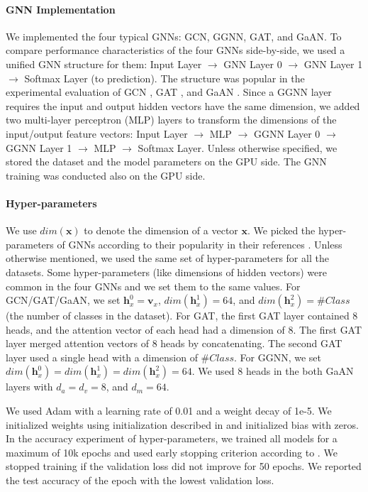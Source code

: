 \paragraph{GNN Implementation}
We implemented the four typical GNNs: GCN, GGNN, GAT, and GaAN.
To compare performance characteristics of the four GNNs side-by-side, we used a unified GNN structure for them: Input Layer $\rightarrow$ GNN Layer 0 $\rightarrow$ GNN Layer 1 $\rightarrow$ Softmax Layer (to prediction).
The structure was popular in the experimental evaluation of GCN \cite{kipf2017_gcn}, GAT \cite{huang2018_gat}, and GaAN \cite{zhang2018_gaan}.
Since a GGNN layer requires the input and output hidden vectors have the same dimension, we added two multi-layer perceptron (MLP) layers to transform the dimensions of the input/output feature vectors: Input Layer $\rightarrow$ MLP $\rightarrow$ GGNN Layer 0 $\rightarrow$ GGNN Layer 1 $\rightarrow$ MLP $\rightarrow$ Softmax Layer.
Unless otherwise specified, we stored the dataset and the model parameters on the GPU side.
The GNN training was conducted also on the GPU side.

\paragraph{Hyper-parameters}
\label{sec:hyper-parameters}

We use $dim(\boldsymbol{x})$ to denote the dimension of a vector $\boldsymbol{x}$.
%
We picked the hyper-parameters of GNNs according to their popularity in their references \cite{kipf2017_gcn, li2015_ggnn, huang2018_gat, zhang2018_gaan}.
%
Unless otherwise mentioned, we used the same set of hyper-parameters for all the datasets. 
%
Some hyper-parameters (like dimensions of hidden vectors) were common in the four GNNs and we set them to the same values.
%
For GCN/GAT/GaAN, we set $\boldsymbol{h}^0_x = \boldsymbol{v}_x$, $dim(\boldsymbol{h}^1_x)=64$, and $dim(\boldsymbol{h}^2_x)=\#Class$ (the number of classes in the dataset).
%
For GAT, the first GAT layer contained 8 heads, and the attention vector of each head had a dimension of 8.
%
The first GAT layer merged attention vectors of 8 heads by concatenating.
%
The second GAT layer used a single head with a dimension of $\#Class$.
%
For GGNN, we set $dim(\boldsymbol{h}^0_x) = dim(\boldsymbol{h}^1_x) = dim(\boldsymbol{h}^2_x) = 64$.
%
We used 8 heads in the both GaAN layers with $d_a=d_v=8$, and $d_m=64$.

We used Adam \cite{diederik2015_adam} with a learning rate of 0.01 and a weight decay of 1e-5.
%
We initialized weights using initialization described in \cite{xavier2010_glorot} and initialized bias with zeros.
%
In the accuracy experiment of hyper-parameters, we trained all models for a maximum of 10k epochs and used early stopping criterion according to \cite{shchur2018_pitfall_of_gnn}.
We stopped training if the validation loss did not improve for 50 epochs. We reported the test accuracy of the epoch with the lowest validation loss.

